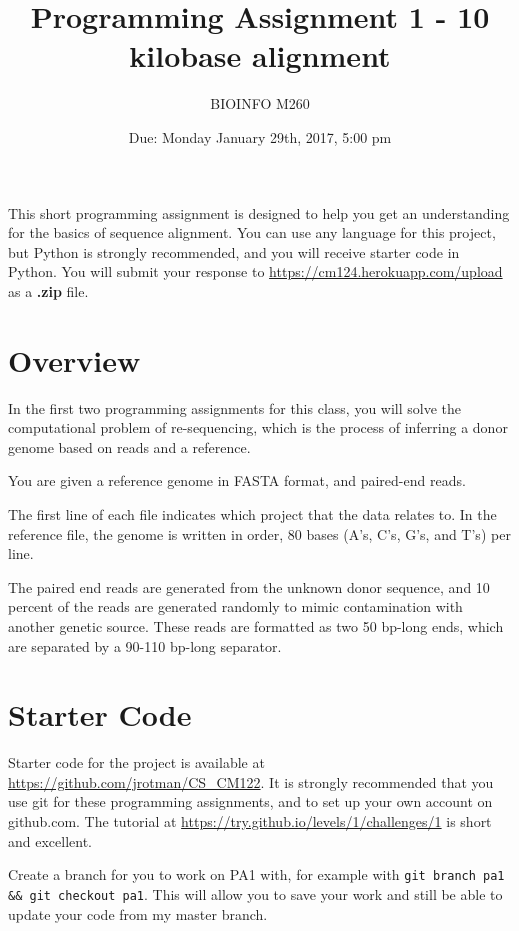 \documentclass{article}
\begin{document}
\title{Programming Assignment 1 - 10 kilobase alignment}

\author{BIOINFO M260}

\date{Due: Monday January 29th, 2017, 5:00 pm}

\maketitle

This short programming assignment is designed to help you get an
understanding for the basics of sequence alignment. You can use any language
for this project, but Python is strongly recommended, and you will receive starter code in Python. You will submit your response to \url{https://cm124.herokuapp.com/upload} as a \textbf{.zip} file.

\section*{Overview}
In the first two programming assignments for this class, you will solve the computational problem of re-sequencing, which is the process of inferring a donor genome based on reads and a reference. 

You are given a reference genome in FASTA format, and paired-end reads.

The first line of each file indicates which project that the data relates to. In the reference file, the genome is written in order, 80 bases (A's, C's, G's, and T's) per line.

The paired end reads are generated from the unknown donor sequence, and 10 percent of the reads are generated randomly to mimic contamination with another genetic source. These reads are formatted as two 50 bp-long ends, which are separated by a 90-110 bp-long separator. 

\section*{Starter Code}

Starter code for the project is available at \url{https://github.com/jrotman/CS_CM122}. It is strongly recommended that you use git for these programming assignments, and to set up your own account on github.com. The tutorial at \url{https://try.github.io/levels/1/challenges/1} is short and excellent.

Create a branch for you to work on PA1 with, for example with \verb!git branch pa1 && git checkout pa1!. This will allow you to save your work and still be able to update your code from my master branch.
\end{document}

